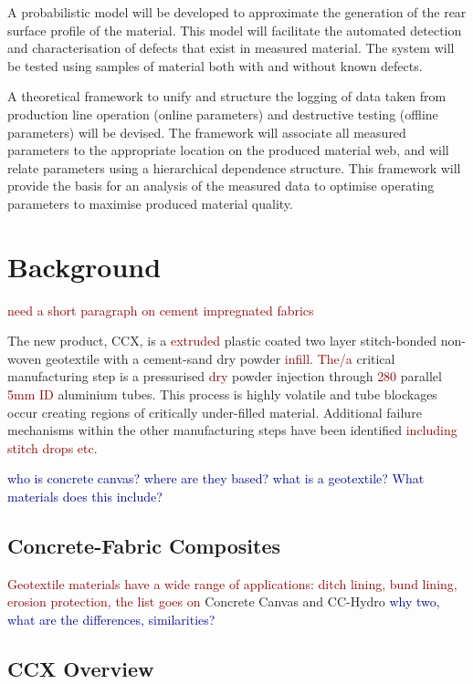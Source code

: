 \documentclass[12pt]{report}
\newcommand{\tcr}[1]{\textcolor{darkRed}{#1}}
\newcommand{\tcb}[1]{\textcolor{darkBlue}{#1}}
\begin{document}
        A probabilistic model will be developed to approximate the generation of the rear surface profile of the material. This model will facilitate the automated detection and characterisation of defects that exist in measured material. The system will be tested using samples of material both with and without known defects.
        
        A theoretical framework to unify and structure the logging of data taken from production line operation (online parameters) and destructive testing (offline parameters) will be devised. The framework will associate all measured parameters to the appropriate location on the produced material web, and will relate parameters using a hierarchical dependence structure. This framework will provide the basis for an analysis of the measured data to optimise operating parameters to maximise produced material quality.
        
        
        
\pagebreak
\chapter{Background}

    \tcr{need a short paragraph on cement impregnated fabrics}
    
    The new product, CCX, is a \tcr{extruded} plastic  coated two layer stitch-bonded non-woven geotextile with a cement-sand dry powder \tcr{infill}. \tcr{The/a} critical manufacturing step is a pressurised \tcr{dry} powder injection  through \tcr{280} parallel \tcr{5mm ID} aluminium tubes. This process is highly volatile and tube blockages occur creating regions of critically under-filled material. Additional failure mechanisms within the other manufacturing steps have been identified \tcr{including stitch drops etc}.
    
    \tcb{who is concrete canvas? where are they based?}
    \tcb{what is a geotextile? What materials does this include?}
    
    
    \section{Concrete-Fabric Composites}
    \tcr{Geotextile materials have a wide range of applications: ditch lining, bund lining, erosion protection, the list goes on}
    Concrete Canvas and CC-Hydro \tcb{why two, what are the differences, similarities?}
    
    \section{CCX Overview}
\end{document}
